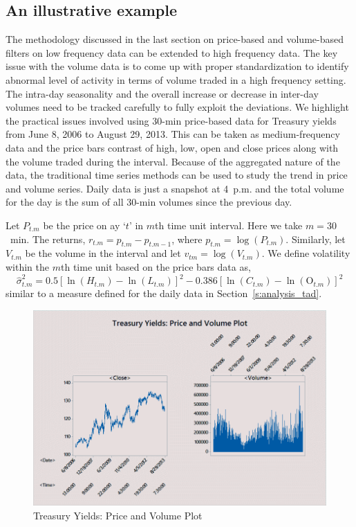 \subsection{An illustrative example \label{sec:illus_ex}}

The methodology discussed in the last section on price-based and volume-based filters on low frequency data can be extended to high frequency data. The key issue with the volume data is to come up with proper standardization to identify abnormal level of activity in terms of volume traded in a high frequency setting. The intra-day seasonality and the overall increase or decrease in inter-day volumes need to be tracked carefully to fully exploit the deviations. We highlight the practical issues involved using 30-min price-based data for Treasury yields from June 8, 2006 to August 29, 2013. This can be taken as medium-frequency data and the price bars contrast of high, low, open and close prices along with the volume traded during the interval. Because of the aggregated nature of the data, the traditional time series methods can be used to study the trend in price and volume series. Daily data is just a snapshot at 4~p.m. and the total volume for the day is the sum of all 30-min volumes since the previous day.


Let $P_{t. m}$ be the price on ay `$t$' in $m$th time unit interval. Here we take $m=30$~min. The returns, $r_{t. m}= p_{t. m} - p_{t . m-1}$, where $p_{t. m}=\log(P_{t.m})$. Similarly, let $V_{t.m}$ be the volume in the interval and let $v_{tm}= \log(V_{t. m})$. We define volatility within the $m$th time unit based on the price bars data as,
	\begin{equation} \label{eqn:hatsigmasq}
	\hat{\sigma}_{t. m}^2= 0.5 [ \ln(H_{t. m}) - \ln(L_{t.m})]^2 - 0.386[\ln(C_{t.m}) - \ln(\text{O}_{t . m})]^2
	\end{equation}
similar to a measure defined for the daily data in Section~\ref{s:analysis_tad}.

        \begin{figure}[!ht]
        \centering
        \includegraphics[width=\textwidth]{chapters/chapter_stat_ts/figures/treasury.png}
        \caption{Treasury Yields: Price and Volume Plot \label{fig:treasuryyields}}
        \end{figure}
        
